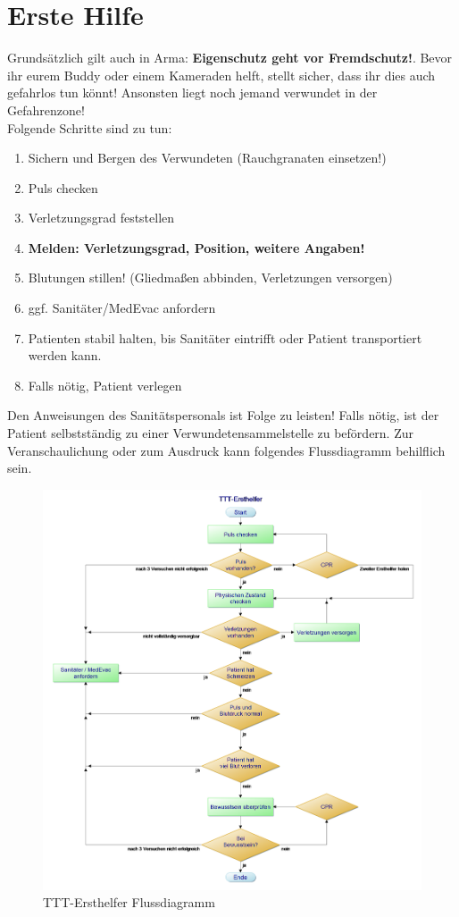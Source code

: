 \pagebreak
\section{Erste Hilfe}
Grundsätzlich gilt auch in Arma: \textbf{Eigenschutz geht vor Fremdschutz!}. Bevor ihr eurem Buddy oder einem Kameraden helft, stellt sicher, dass ihr dies auch gefahrlos tun könnt! Ansonsten liegt noch jemand verwundet in der Gefahrenzone!\\
Folgende Schritte sind zu tun:
\begin{enumerate}
	\item Sichern und Bergen des Verwundeten (Rauchgranaten einsetzen!)
	\item Puls checken
	\item Verletzungsgrad feststellen
	\item \textbf{Melden: Verletzungsgrad, Position, weitere Angaben!}
	\item Blutungen stillen! (Gliedmaßen abbinden, Verletzungen versorgen)
	\item ggf. Sanitäter/MedEvac anfordern
	\item Patienten stabil halten, bis Sanitäter eintrifft oder Patient transportiert werden kann.
	\item Falls nötig, Patient verlegen
\end{enumerate}
Den Anweisungen des Sanitätspersonals ist Folge zu leisten! Falls nötig, ist der Patient selbstständig zu einer Verwundetensammelstelle zu befördern.
Zur Veranschaulichung oder zum Ausdruck kann folgendes Flussdiagramm behilflich sein.
\begin{figure}[htbp]
		\centering
			\includegraphics[width=15cm]{./img/grundlagen/ersteHilfe/TTT-Ersthelfer.png}
			\caption{TTT-Ersthelfer Flussdiagramm}
\end{figure}
